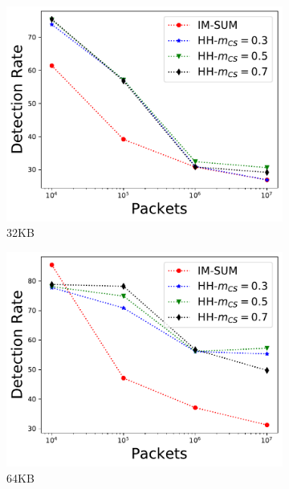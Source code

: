 \begin{figure}
\begin{subfigure}[t]{0.32\textwidth}
    \includegraphics[width=\linewidth]{HH/figures/DR_per_pkts_m=0.03125.pdf}
    \caption{32KB}
    \label{fig:fig2_a}    
\end{subfigure}\hfill
\begin{subfigure}[t]{0.32\textwidth}
    \includegraphics[width=\linewidth]{HH/figures/DR_per_pkts_m=0.0625.pdf}
    \caption{64KB}
    \label{fig:fig2_b}
\end{subfigure}\hfill
\begin{subfigure}[t]{0.32\textwidth}

\end{subfigure}
\end{figure}
